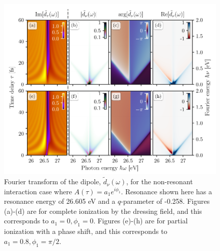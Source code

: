\begin{figure}
	\centering
	\includegraphics[width=1.0\textwidth]{figures/ATS/DCM_non_res_high_low.pdf}
	\caption[Fourier transform of the dipole, $\tilde{d}_{\nu}(\omega)$, for the non-resonant interaction case]{Fourier transform of the dipole, $\tilde{d}_{\nu}(\omega)$, for the non-resonant interaction case where $A(\tau)=a_1e^{i\phi_1}$.  Resonance  shown here has a resonance energy of 26.605 eV and a $q$-parameter of -0.258.  Figures (a)-(d) are for complete ionization by the dressing field, and this corresponds to $a_1=0,\phi_1=0$.  Figures (e)-(h) are for partial ionization with a phase shift, and this corresponds to $a_1=0.8,\phi_1=\pi/2$.}
	\label{fig:non_res_high_low}
\end{figure}

